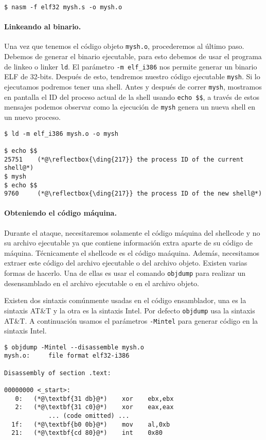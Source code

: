 \begin{lstlisting}
$ nasm -f elf32 mysh.s -o mysh.o
\end{lstlisting}


\paragraph{Linkeando al binario.}
Una vez que tenemos el código objeto \texttt{mysh.o}, procederemos al último paso. Debemos de generar el binario ejecutable, para esto debemos de usar el programa de linkeo o linker \texttt{ld}. El parámetro \texttt{-m elf\_i386} nos permite generar un binario ELF de 32-bits.
Después de esto, tendremos nuestro código ejecutable \texttt{mysh}. Si lo ejecutamos podremos tener una shell.
Antes y después de correr \texttt{mysh}, mostramos en pantalla el ID del proceso actual de la shell usando \texttt{echo \$\$}, a través de estos mensajes podemos observar como la ejecución de \texttt{mysh} genera un nueva shell en un nuevo proceso.

\begin{lstlisting}
$ ld -m elf_i386 mysh.o -o mysh

$ echo $$
25751    (*@\reflectbox{\ding{217}} the process ID of the current shell@*)
$ mysh
$ echo $$
9760     (*@\reflectbox{\ding{217}} the process ID of the new shell@*)
\end{lstlisting}



\paragraph{Obteniendo el código máquina.}
Durante el ataque, necesitaremos solamente el código máquina del shellcode y no su archivo ejecutable ya que contiene información extra aparte de su código de máquina. 
Técnicamente el shellcode es el código maáquina.
Además, necesitamos extraer este código del archivo ejecutable o del archivo objeto. Existen varias formas de hacerlo. Una de ellas es usar el comando \texttt{objdump} para realizar un desensamblado en el archivo ejecutable o en el archivo objeto.

Existen dos sintaxis comúnmente usadas en el código ensamblador, una es la sintaxis AT\&T y la otra es la sintaxis Intel. Por defecto \texttt{objdump} usa la sintaxis AT\&T. A continuación usamos el parámetros \texttt{-Mintel} para generar código en la sintaxis Intel.

\begin{lstlisting}
$ objdump -Mintel --disassemble mysh.o
mysh.o:     file format elf32-i386

Disassembly of section .text:

00000000 <_start>:
   0:	(*@\textbf{31 db}@*)    xor    ebx,ebx
   2:	(*@\textbf{31 c0}@*)    xor    eax,eax
            ... (code omitted) ...
  1f:	(*@\textbf{b0 0b}@*)    mov    al,0xb
  21:	(*@\textbf{cd 80}@*)    int    0x80
\end{lstlisting}
 
